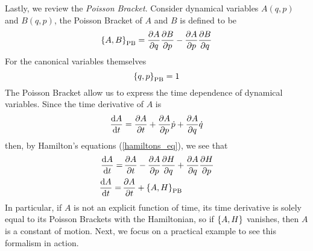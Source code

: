 Lastly, we review the \textit{Poisson Bracket}. Consider  dynamical variables $A(q,p)$ and $B(q,p)$, the Poisson Bracket of $A$ and $B$ is defined to be
\begin{equation}
    \pb{A}{B}_\text{PB}=\pdv{A}{q}\pdv{B}{p}-\pdv{A}{p}\pdv{B}{q}
\end{equation}
For the canonical variables themselves
\begin{equation}
    \pb{q}{p}_{\text{PB}}=1
    \label{canonical_poisson}
\end{equation}
The Poisson Bracket allow us to express the time dependence of dynamical variables. Since the time derivative of $A$ is
\begin{equation}
    \dv{A}{t}=\pdv{A}{t}+\pdv{A}{p}\dot{p}+\pdv{A}{q}\dot{q}
\end{equation}
then, by Hamilton's equations (\ref{hamiltons_eq}), we see that
\begin{equation}
    \begin{split}
        \dv{A}{t}=&\,\pdv{A}{t}-\pdv{A}{p}\pdv{H}{q}+\pdv{A}{q}\pdv{H}{p}\\
        \dv{A}{t}=\,&\pdv{A}{t} +\pb{A}{H}_\text{PB}
    \end{split}
    \label{eq_motion_dynamical_variable}
\end{equation}
In particular, if $A$ is not an explicit function of time, its time derivative is solely equal to its Poisson Brackets with the Hamiltonian, so if $\pb{A}{H}$ vanishes, then $A$ is a constant of motion. Next, we focus on a practical example to see this formalism in action.
